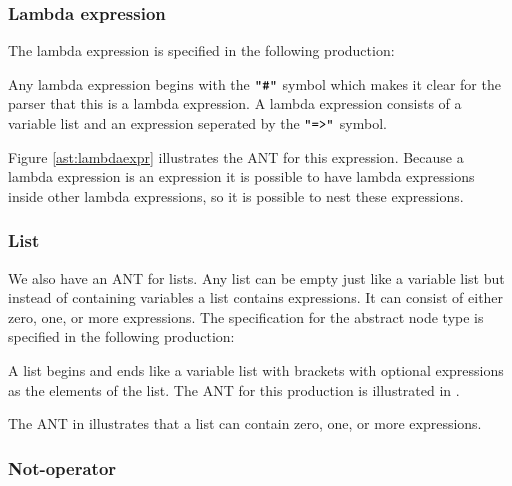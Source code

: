 

\subsubsection{Lambda expression}

The lambda expression is specified in the following production:

\begin{ebnf}
\end{ebnf}

Any lambda expression begins with the $\texttt{"\#"}$ symbol which makes it clear for the
parser that this is a lambda expression. A lambda expression consists of a
variable list and an expression seperated by the $\texttt{"=>"}$ symbol.



Figure \ref{ast:lambdaexpr} illustrates the ANT for this expression. Because a
lambda expression is an expression it is possible to have lambda expressions
inside other lambda expressions, so it is possible to nest these expressions.

\subsubsection{List}

We also have an ANT for lists. Any list can be empty
just like a variable list but instead of containing variables a list contains
expressions. It can consist of either zero, one, or more expressions. The
specification for the abstract node type is specified in the following
production:

\begin{ebnf}
\end{ebnf}

A list begins and ends like a variable list with brackets with optional
expressions as the elements of the list. The ANT for this production is illustrated
in .



The ANT in  illustrates that a list can contain zero, one, or
more expressions.

\subsubsection{Not-operator}


